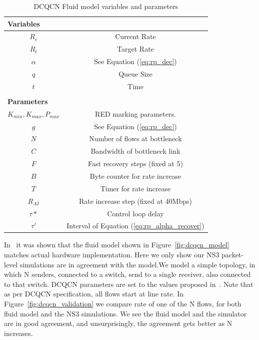 \begin{table}
\center
{
\footnotesize
{
\begin{tabular}{|c|c|}
\multicolumn{2}{l}{\bf Variables} \\ \hline
$R_c$ & Current Rate \\ \hline
$R_t$ & Target Rate \\ \hline
$\alpha$ & See Equation (\ref{eq:rp_dec}) \\ \hline
$q$ & Queue Size \\ \hline
$t$ & Time \\ \hline
\multicolumn{2}{c}{} \\
\multicolumn{2}{l}{\bf Parameters} \\ \hline
$K_{min}, K_{max}, P_{max}$ & RED marking parameters. \\ \hline
$g$ & See Equation (\ref{eq:rp_dec}) \\ \hline
$N$ & Number of flows at bottleneck\\ \hline
$C$ & Bandwidth of bottleneck link\\ \hline
$F$ & Fast recovery steps (fixed at 5) \\ \hline
$B$ & Byte counter for rate increase\\ \hline
$T$ & Timer for rate increase\\ \hline
$R_{AI}$ & Rate increase step (fixed at 40Mbps)\\ \hline
$\tau *$ & Control loop delay \\ \hline
$\tau '$ & Interval of Equation (\ref{eq:rp_alpha_recover})\\ \hline
\end{tabular}
}
}
\caption{DCQCN Fluid model variables and parameters}
\label{tab:dcqcn_varparam}
\end{table}

In~\cite{dcqcn} it was shown that the fluid model shown in
Figure~\ref{fig:dcqcn_model} matches actual hardware implementation. Here we
only show our NS3 packet-level simulations are in agreement with the model.We
model a simple topology, in which N senders, connected to a switch, send to a
single receiver, also connected to that switch. DCQCN parameters are set to the
values proposed in~\cite{dcqcn}. Note that as per DCQCN specification, all flows
start at line rate. In Figure~\ref{fig:dcqcn_validation} we compare rate of one
of the N flows, for both fluid model and the NS3 simulations. We see the fluid
model and the simulator are in good agreement, and unsurprisingly, the agreement
gets better as N increases.

